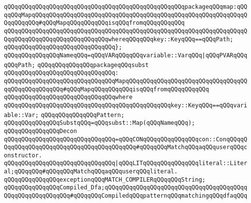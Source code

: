 \newline
\verb|qQQqqQQqqQQqqQQqqQQqqQQqqQQqqQQqqQQqqQQqqQQqqQQqqQQqpackageqQQqmap:qQQqqQQqMapqQQqqQQqqQQqqQQqqQQqqQQqqQQqqQQqqQQqqQQqqQQqqQQqqQQqqQQqqQQqqQQqqQQqqQQq#qQQqMapqQQqqQQqqQQqisqQQqfromqQQqqQQqqQQq|\newline
\verb|qQQqqQQqqQQqqQQqqQQqqQQqqQQqqQQqqQQqqQQqqQQqqQQqqQQqqQQqqQQqqQQqqQQqqQQqqQQqqQQqqQQqqQQqqQQqqQQqqQQqwhereqQQqqQQqkey::KeyqQQq==qQQqPath;|\newline
\verb|qQQqqQQqqQQqqQQqqQQqqQQqqQQqqQQq};|\newline
\newline
\verb|qQQqqQQqqQQqqQQqNameqQQq=qQQqVARqQQqqQQqvariable::VarqQQq|\verb#|qQQqPVARqQQqqQQqPath;#\newline
\newline
\verb|qQQqqQQqqQQqqQQqpackageqQQqsubst|\newline
\verb|qQQqqQQqqQQqqQQqqQQqqQQqqQQqqQQq:|\newline
\verb|qQQqqQQqqQQqqQQqqQQqqQQqqQQqqQQqMapqQQqqQQqqQQqqQQqqQQqqQQqqQQqqQQqqQQqqQQqqQQqqQQqqQQq#qQQqMapqQQqqQQqqQQqisqQQqfromqQQqqQQqqQQq|\newline
\verb|qQQqqQQqqQQqqQQqqQQqqQQqqQQqqQQqwhere|\newline
\verb|qQQqqQQqqQQqqQQqqQQqqQQqqQQqqQQqqQQqqQQqqQQqqQQqkey::KeyqQQq==qQQqvariable::Var;|\newline
\newline
\verb|qQQqqQQqqQQqqQQqPattern;|\newline
\verb|qQQqqQQqqQQqqQQqSubstqQQq=qQQqsubst::Map(qQQqNameqQQq);|\newline
\newline
\verb|qQQqqQQqqQQqqQQqDecon|\newline
\verb|qQQqqQQqqQQqqQQqqQQqqQQqqQQqqQQq=qQQqCONqQQqqQQqqQQqqQQqcon::ConqQQqqQQqqQQqqQQqqQQqqQQqqQQqqQQqqQQqqQQqqQQq#qQQqqQQqMatchqQQqaqQQquserqQQqconstructor.|\newline
\verb|qQQqqQQqqQQqqQQqqQQqqQQqqQQqqQQq|\verb#|qQQqLITqQQqqQQqqQQqqQQqliteral::Literal;qQQqqQQq#\verb|#qQQqqQQqMatchqQQqaqQQquserqQQqliteral.|\newline
\newline
\verb|qQQqqQQqqQQqqQQqexceptionqQQqMATCH_COMPILERqQQqqQQqString;|\newline
\newline
\verb|qQQqqQQqqQQqqQQqCompiled_Dfa;qQQqqQQqqQQqqQQqqQQqqQQqqQQqqQQqqQQqqQQqqQQqqQQqqQQqqQQqqQQq#qQQqqQQqCompiledqQQqpatternqQQqmatchingqQQqdfaqQQq|\newline
